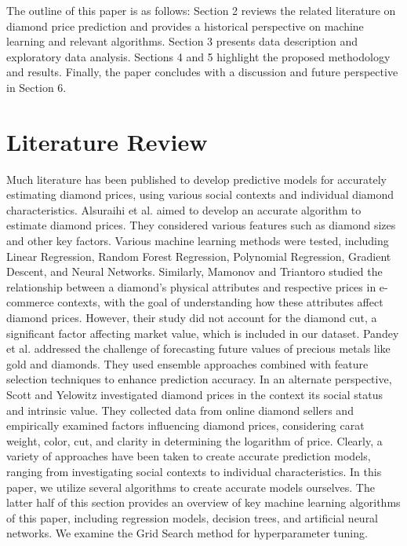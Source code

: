 \documentclass[conference]{IEEEtran}
\begin{document}
The outline of this paper is as follows: Section 2 reviews the related literature on diamond price prediction and provides a historical perspective on machine learning and relevant algorithms. Section 3 presents data description and exploratory data analysis. Sections 4 and 5 highlight the proposed methodology and results. Finally, the paper concludes with a discussion and future perspective in Section 6.

\section{Literature Review}

Much literature has been published to develop predictive models for accurately estimating diamond prices, using various social contexts and individual diamond characteristics. Alsuraihi et al. \cite{Alsuraihi} aimed to develop an accurate algorithm to estimate diamond prices. They considered various features such as diamond sizes and other key factors. Various machine learning methods were tested, including Linear Regression, Random Forest Regression, Polynomial Regression, Gradient Descent, and Neural Networks. Similarly, Mamonov and Triantoro \cite{Mamonov} studied the relationship between a diamond's physical attributes and respective prices in e-commerce contexts, with the goal of understanding how these attributes affect diamond prices. However, their study did not account for the diamond cut, a significant factor affecting market value, which is included in our dataset. Pandey et al. \cite{Pandey} addressed the challenge of forecasting future values of precious metals like gold and diamonds. They used ensemble approaches combined with feature selection techniques to enhance prediction accuracy. In an alternate perspective, Scott and Yelowitz \cite{Scott} investigated diamond prices in the context its social status and intrinsic value. They collected data from online diamond sellers and empirically examined factors influencing diamond prices, considering carat weight, color, cut, and clarity in determining the logarithm of price. Clearly, a variety of approaches have been taken to create accurate prediction models, ranging from investigating social contexts to individual characteristics. In this paper, we utilize several algorithms to create accurate models ourselves. The latter half of this section provides an overview of key machine learning algorithms of this paper, including regression models, decision trees, and artificial neural networks. We examine the Grid Search method for hyperparameter tuning.
\end{document}
